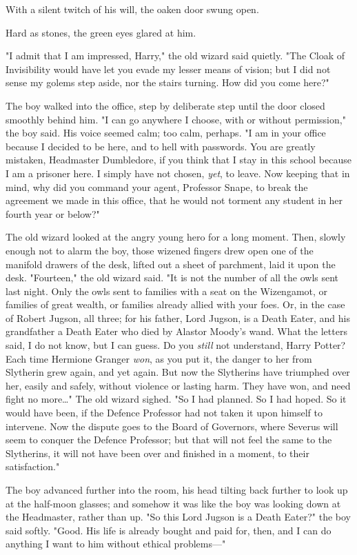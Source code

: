With a silent twitch of his will, the oaken door swung open.

Hard as stones, the green eyes glared at him.

"I admit that I am impressed, Harry," the old wizard said quietly. "The Cloak
of Invisibility would have let you evade my lesser means of vision; but I did
not sense my golems step aside, nor the stairs turning. How did you come here?"

The boy walked into the office, step by deliberate step until the door closed
smoothly behind him. "I can go anywhere I choose, with or without permission,"
the boy said. His voice seemed calm; too calm, perhaps. "I am in your office
because I decided to be here, and to hell with passwords. You are greatly
mistaken, Headmaster Dumbledore, if you think that I stay in this school
because I am a prisoner here. I simply have not chosen, \emph{yet}, to leave.
Now keeping that in mind, why did you command your agent, Professor Snape, to
break the agreement we made in this office, that he would not torment any
student in her fourth year or below?"

The old wizard looked at the angry young hero for a long moment. Then, slowly
enough not to alarm the boy, those wizened fingers drew open one of the
manifold drawers of the desk, lifted out a sheet of parchment, laid it upon the
desk. "Fourteen," the old wizard said. "It is not the number of all the owls
sent last night. Only the owls sent to families with a seat on the Wizengamot,
or families of great wealth, or families already allied with your foes. Or, in
the case of Robert Jugson, all three; for his father, Lord Jugson, is a Death
Eater, and his grandfather a Death Eater who died by Alastor Moody's wand. What
the letters said, I do not know, but I can guess. Do you \emph{still} not
understand, Harry Potter? Each time Hermione Granger \emph{won}, as you put it,
the danger to her from Slytherin grew again, and yet again. But now the
Slytherins have triumphed over her, easily and safely, without violence or
lasting harm. They have won, and need fight no more{\ldots}" The old wizard
sighed. "So I had planned. So I had hoped. So it would have been, if the
Defence Professor had not taken it upon himself to intervene. Now the dispute
goes to the Board of Governors, where Severus will seem to conquer the Defence
Professor; but that will not feel the same to the Slytherins, it will not have
been over and finished in a moment, to their satisfaction."

The boy advanced further into the room, his head tilting back further to look
up at the half-moon glasses; and somehow it was like the boy was looking down
at the Headmaster, rather than up. "So this Lord Jugson is a Death Eater?" the
boy said softly. "Good. His life is already bought and paid for, then, and I
can do anything I want to him without ethical problems---"

